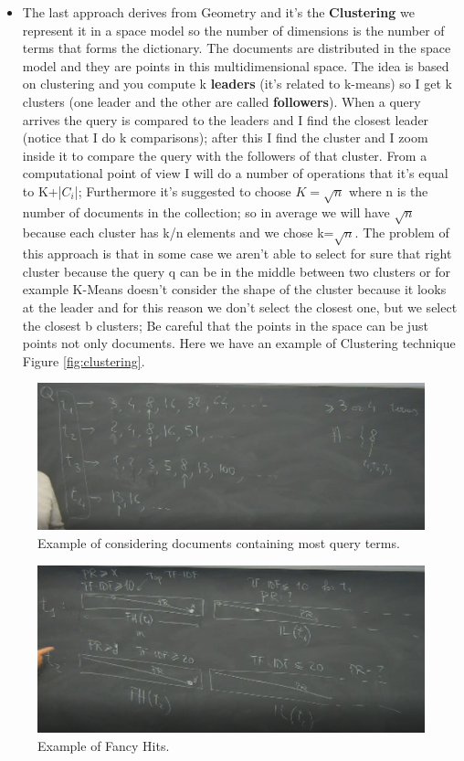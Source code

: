 \begin{itemize}
    \item The last approach derives from Geometry and it's the \textbf{Clustering} we represent it in a space model so the number of dimensions is the number of terms that forms the dictionary. The documents are distributed in the space model and they are points in this multidimensional space. The idea is based on clustering and you compute k \textbf{leaders} (it's related to k-means) so I get k clusters (one leader and the other are called \textbf{followers}). When a query arrives the query is compared to the leaders and I find the closest leader (notice that I do k comparisons); after this I find the cluster and I zoom inside it to compare the query with the followers of that cluster. From a computational point of view I will do a number of operations that it's equal to K+|$C_i$|; Furthermore it's suggested to choose $K=\sqrt{n}$ where n is the number of documents in the collection; so in average we will have $\sqrt{n}$ because each cluster has k/n elements and we chose k=$\sqrt{n}$. The problem of this approach is that in some case we aren't able to select for sure that right cluster because the query q can be in the middle between two clusters or for example K-Means doesn't consider the shape of the cluster because it looks at the leader and for this reason we don't select the closest one, but we select the closest b clusters; Be careful that the points in the space can be just points not only documents. Here we have an example of Clustering technique Figure \ref{fig:clustering}.
\end{itemize}
\begin{figure}
    \centering
    \includegraphics[width=0.75\linewidth]{images/mostqueryterm.PNG}
    \caption{Example of considering documents containing most query terms.}
    \label{fig:mostqueryterms}
\end{figure}
\begin{figure}
    \centering
    \includegraphics[width=\linewidth]{images/fancyhits2.PNG}
    \caption{Example of Fancy Hits.}
    \label{fig:fancyhits}
\end{figure}
